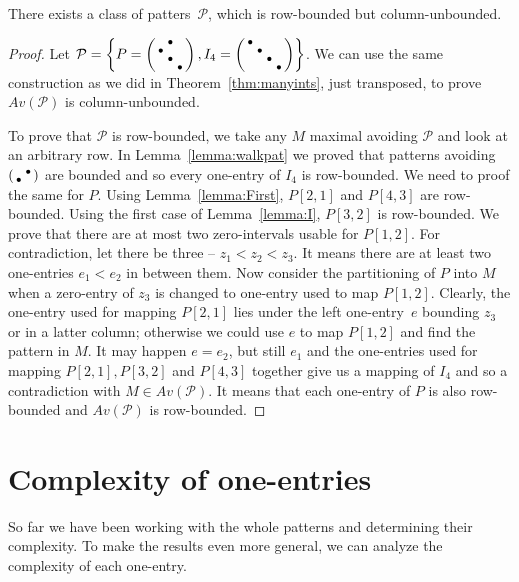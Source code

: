 \begin{lemma}
There exists a class of patters~$\mathcal{P}$, which is row-bounded but column-unbounded.
\end{lemma}
\begin{proof}
Let $\mathcal{P}=\left\lbrace P=\left(\begin{smallmatrix} &\bullet& \\\bullet& & \\ &\bullet& \\ & &\bullet\end{smallmatrix}\right),I_4=\left(\begin{smallmatrix}\bullet& & & \\ &\bullet& & \\ & &\bullet& \\ & & &\bullet\end{smallmatrix}\right)\right\rbrace$. We can use the same construction as we did in Theorem~\ref{thm:manyints}, just transposed, to prove $Av(\mathcal{P})$ is column-unbounded.

To prove that $\mathcal{P}$ is row-bounded, we take any $M$ maximal avoiding $\mathcal{P}$ and look at an arbitrary row. In Lemma~\ref{lemma:walkpat} we proved that patterns avoiding $\left(\begin{smallmatrix} &\bullet\\\bullet& \end{smallmatrix}\right)$ are bounded and so every one-entry of $I_4$ is row-bounded. We need to proof the same for $P$. Using Lemma~\ref{lemma:First}, $P[2,1]$ and $P[4,3]$ are row-bounded. Using the first case of Lemma~\ref{lemma:I}, $P[3,2]$ is row-bounded. We prove that there are at most two zero-intervals usable for $P[1,2]$. For contradiction, let there be three -- $z_1<z_2<z_3$. It means there are at least two one-entries $e_1<e_2$ in between them. Now consider the partitioning of $P$ into $M$ when a zero-entry of $z_3$ is changed to one-entry used to map $P[1,2]$. Clearly, the one-entry used for mapping $P[2,1]$ lies under the left one-entry~$e$ bounding $z_3$ or in a latter column; otherwise we could use $e$ to map $P[1,2]$ and find the pattern in $M$. It may happen $e=e_2$, but still $e_1$ and the one-entries used for mapping $P[2,1],P[3,2]$ and $P[4,3]$ together give us a mapping of $I_4$ and so a contradiction with $M\in Av(\mathcal{P})$. It means that each one-entry of $P$ is also row-bounded and $Av(\mathcal{P})$ is row-bounded.
\end{proof}

\section{Complexity of one-entries}
So far we have been working with the whole patterns and determining their complexity. To make the results even more general, we can analyze the complexity of each one-entry.

